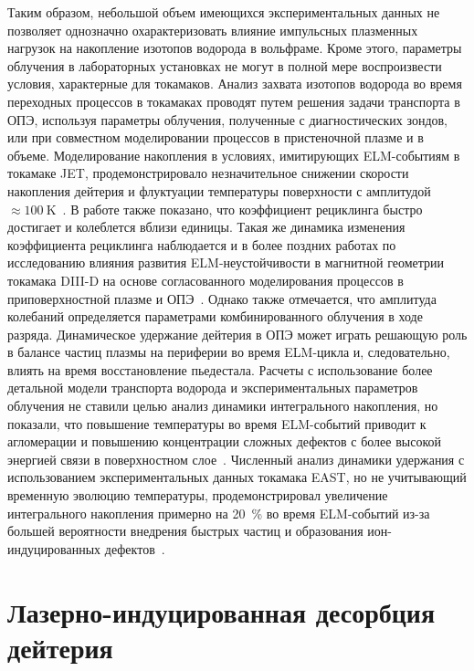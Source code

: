 Таким образом, небольшой объем имеющихся экспериментальных данных не позволяет однозначно охарактеризовать влияние импульсных плазменных нагрузок на накопление изотопов водорода в вольфраме. Кроме этого, параметры облучения в лабораторных установках не могут в полной мере воспроизвести условия, характерные для токамаков. Анализ захвата изотопов водорода во время переходных процессов в токамаках проводят путем решения задачи транспорта в ОПЭ, используя параметры облучения, полученные с диагностических зондов, или при совместном моделировании процессов в пристеночной плазме и в объеме. Моделирование накопления в условиях, имитирующих ELM-событиям в токамаке JET, продемонстрировало незначительное снижении скорости накопления дейтерия и флуктуации температуры поверхности с амплитудой \( \approx \SI{100}{\kelvin} \)~\cite{Schmid2016}. В работе также показано, что коэффициент рециклинга быстро достигает и колеблется вблизи единицы. Такая же динамика изменения коэффициента рециклинга наблюдается и в более поздних работах по исследованию влияния развития ELM-неустойчивости в магнитной геометрии токамака DIII-D на основе согласованного моделирования процессов в приповерхностной плазме и ОПЭ~\cite{Lasa2024,Smirnov2024}. Однако также отмечается, что амплитуда колебаний определяется параметрами комбинированного облучения в ходе разряда. Динамическое удержание дейтерия в ОПЭ может играть решающую роль в балансе частиц плазмы на периферии во время ELM-цикла и, следовательно, влиять на время восстановление пьедестала. Расчеты с использование более детальной модели транспорта водорода и экспериментальных параметров облучения не ставили целью анализ динамики интегрального накопления, но показали, что повышение температуры во время ELM-событий приводит к агломерации и повышению концентрации сложных дефектов с более высокой энергией связи в поверхностном слое~\cite{Heinola2019}. Численный анализ динамики удержания с использованием экспериментальных данных токамака EAST, но не учитывающий временную эволюцию температуры, продемонстрировал увеличение интегрального накопления примерно на \SI{20}{\percent} во время ELM-событий из-за большей вероятности внедрения быстрых частиц и образования ион-индуцированных дефектов~\cite{Sang2014}.  

\section{Лазерно-индуцированная десорбция дейтерия}\label{sec:ch1/sec5}


